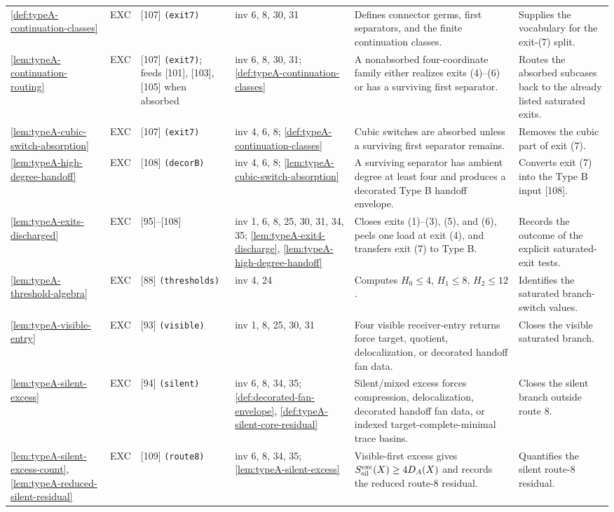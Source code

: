 \documentclass[11pt]{article}
\begin{document}
{\begin{longtable}{L{0.10\textwidth} C{0.045\textwidth} L{0.13\textwidth} L{0.135\textwidth} L{0.28\textwidth} L{0.20\textwidth}}
\cref{def:typeA-continuation-classes} & EXC & [107] \texttt{(exit7)} & inv 6, 8, 30, 31 & Defines connector germs, first separators, and the finite continuation classes. & Supplies the vocabulary for the exit-(7) split. \\
\cref{lem:typeA-continuation-routing} & EXC & [107] \texttt{(exit7)}; feeds [101], [103], [105] when absorbed & inv 6, 8, 30, 31; \cref{def:typeA-continuation-classes} & A nonabsorbed four-coordinate family either realizes exits (4)--(6) or has a surviving first separator. & Routes the absorbed subcases back to the already listed saturated exits. \\
\cref{lem:typeA-cubic-switch-absorption} & EXC & [107] \texttt{(exit7)} & inv 4, 6, 8; \cref{def:typeA-continuation-classes} & Cubic switches are absorbed unless a surviving first separator remains. & Removes the cubic part of exit (7). \\
\cref{lem:typeA-high-degree-handoff} & EXC & [108] \texttt{(decorB)} & inv 4, 6, 8; \cref{lem:typeA-cubic-switch-absorption} & A surviving separator has ambient degree at least four and produces a decorated Type B handoff envelope. & Converts exit (7) into the Type B input [108]. \\
\cref{lem:typeA-exits-discharged} & EXC & [95]--[108] & inv 1, 6, 8, 25, 30, 31, 34, 35; \cref{lem:typeA-exit4-discharge}, \cref{lem:typeA-high-degree-handoff} & Closes exits (1)--(3), (5), and (6), peels one load at exit (4), and transfers exit (7) to Type B. & Records the outcome of the explicit saturated-exit tests. \\
\cref{lem:typeA-threshold-algebra} & EXC & [88] \texttt{(thresholds)} & inv 4, 24 & Computes $H_0\le4$, $H_1\le8$, $H_2\le12$. & Identifies the saturated branch-switch values. \\
\cref{lem:typeA-visible-entry} & EXC & [93] \texttt{(visible)} & inv 1, 8, 25, 30, 31 & Four visible receiver-entry returns force target, quotient, delocalization, or decorated handoff fan data. & Closes the visible saturated branch. \\
\cref{lem:typeA-silent-excess} & EXC & [94] \texttt{(silent)} & inv 6, 8, 34, 35; \cref{def:decorated-fan-envelope}, \cref{def:typeA-silent-core-residual} & Silent/mixed excess forces compression, delocalization, decorated handoff fan data, or indexed target-complete-minimal trace basins. & Closes the silent branch outside route 8. \\
\cref{lem:typeA-silent-excess-count}, \cref{lem:typeA-reduced-silent-residual} & EXC & [109] \texttt{(route8)} & inv 6, 8, 34, 35; \cref{lem:typeA-silent-excess} & Visible-first excess gives \(S_{\rm sil}^{\rm exc}(X)\ge4D_A(X)\) and records the reduced route-8 residual. & Quantifies the silent route-8 residual. \\

\end{longtable}}
\end{document}
